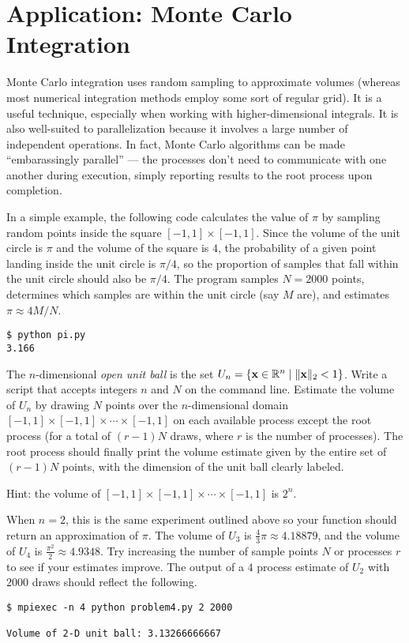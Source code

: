 \section*{Application: Monte Carlo Integration}

Monte Carlo integration uses random sampling to approximate volumes (whereas most numerical integration methods employ some sort of regular grid).
It is a useful technique, especially when working with higher-dimensional integrals.
It is also well-suited to parallelization because it involves a large number of independent operations.
In fact, Monte Carlo algorithms can be made ``embarassingly parallel'' --- the processes don't need to communicate with one another during execution, simply reporting results to the root process upon completion.

In a simple example, the following code calculates the value of $\pi$ by sampling random points inside the square $[-1,1]\times[-1,1]$.
Since the volume of the unit circle is $\pi$ and the volume of the square is $4$, the probability of a given point landing inside the unit circle is $\pi/4$, so the proportion of samples that fall within the unit circle should also be $\pi/4$.
The program samples $N = 2000$ points, determines which samples are within the unit circle (say $M$ are), and estimates $\pi\approx 4M/N$.

\begin{lstlisting}
$ python pi.py
3.166
\end{lstlisting}

\begin{problem}
The $n$-dimensional \emph{open unit ball} is the set $U_n = \{\mathbf{x}\in\mathbb{R}^n\mid \|\mathbf{x}\|_2 < 1\}$.
Write a script that accepts integers $n$ and $N$ on the command line.
Estimate the volume of $U_n$ by drawing $N$ points over the $n$-dimensional domain $[-1,1]\times[-1,1]\times\cdots\times[-1,1]$ on each available process except the root process (for a total of $(r-1)N$ draws, where $r$ is the number of processes).
The root process should finally print the volume estimate given by the entire set of $(r-1)N$ points, with the dimension of the unit ball clearly labeled.

\noindent Hint: the volume of $[-1,1]\times[-1,1]\times\cdots\times[-1,1]$ is $2^n$.

When $n=2$, this is the same experiment outlined above so your function should return an approximation of $\pi$.
The volume of $U_3$ is $\frac{4}{3}\pi \approx 4.18879$, and the volume of $U_4$ is $\frac{\pi^2}{2} \approx 4.9348$.
Try increasing the number of sample points $N$ or processes $r$ to see if your estimates improve.
The output of a $4$ process estimate of $U_2$ with $2000$ draws should reflect the following.
\begin{lstlisting}[style=ShellOutput]
$ mpiexec -n 4 python problem4.py 2 2000

Volume of 2-D unit ball: 3.13266666667
\end{lstlisting}
\end{problem}

